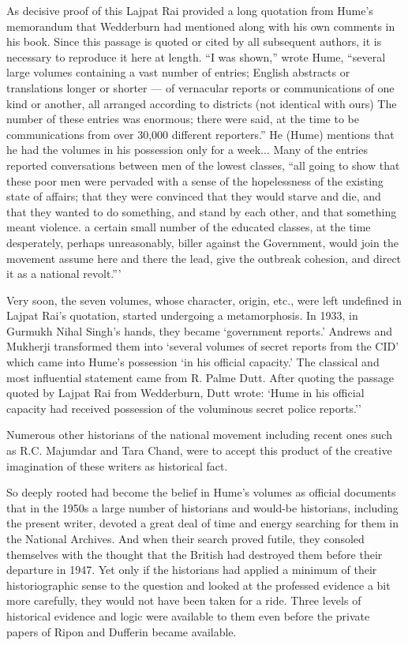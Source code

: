 As decisive proof of this Lajpat Rai provided a long quotation from Hume's memorandum that Wedderburn had mentioned along with his own comments in his book. Since this passage is quoted or cited by all subsequent authors, it is necessary to reproduce it here at length. ``I was shown,'' wrote Hume, ``several large volumes containing a vast number of entries; English abstracts or translations longer or shorter — of vernacular reports or communications of one kind or another, all arranged according to districts (not identical with ours) The number of these entries was enormous; there were said, at the time to be communications from over 30,000 different reporters.'' He (Hume) mentions that he had the volumes in his possession only for a week... Many of the entries reported conversations between men of the lowest classes, ``all going to show that these poor men were pervaded with a sense of the hopelessness of the existing state of affairs; that they were convinced that they would starve and die, and that they wanted to do something, and stand by each other, and that something meant violence. a certain small number of the educated classes, at the time desperately, perhaps unreasonably, biller against the Government, would join the movement assume here and there the lead, give the outbreak cohesion, and direct it as a national revolt.'''

Very soon, the seven volumes, whose character, origin, etc., were left undefined in Lajpat Rai's quotation, started undergoing a metamorphosis. In 1933, in Gurmukh Nihal Singh's hands, they became `government reports.' Andrews and Mukherji transformed them into `several volumes of secret reports from the CID' which came into Hume's possession `in his official capacity.' The classical and most influential statement came from R. Palme Dutt. After quoting the passage quoted by Lajpat Rai from Wedderburn, Dutt wrote: `Hume in his official capacity had received possession of the voluminous secret police reports.''

Numerous other historians of the national movement including recent ones such as R.C. Majumdar and Tara Chand, were to accept this product of the creative imagination of these writers as historical fact.

So deeply rooted had become the belief in Hume's volumes as official documents that in the 1950s a large number of historians and would-be historians, including the present writer, devoted a great deal of time and energy searching for them in the National Archives. And when their search proved futile, they consoled themselves with the thought that the British had destroyed them before their departure in 1947. Yet only if the historians had applied a minimum of their historiographic sense to the question and looked at the professed evidence a bit more carefully, they would not have been taken for a ride. Three levels of historical evidence and logic were available to them even before the private papers of Ripon and Dufferin became available.

